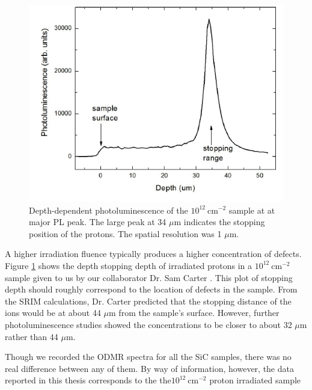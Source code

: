 \documentclass[oneside, noacknowlegments]{BYUPhys}
\begin{document}
\begin{figure}[h]
    \centerline{\includegraphics{srim_fig}}
    \caption[SiC Depth-Dependent Photoluminescence]{\label{fig:SiCDepth}
     Depth-dependent photoluminescence of the $10^{12}~\text{cm}^{−2}$ sample at at major PL peak. The large peak at 34 $\mu$m indicates the stopping position of the protons. The spatial resolution was 1 $\mu$m.}
 \end{figure}

A higher irradiation fluence typically produces a higher concentration of defects. Figure \ref{fig:SiCDepth} shows the depth stopping depth of irradiated protons in a $10^{12}~\text{cm}^{-2}$ sample given to us by our collaborator Dr. Sam Carter \cite{RefWorks:doc:5892964ee4b0499fa95c5108}. This plot of stopping depth should roughly correspond to the location of defects in the sample. From the SRIM calculations, Dr. Carter predicted that the stopping distance of the ions would be at about 44 $\mu$m from the sample's surface. However, further photoluminescence studies showed the concentrations to be closer to about 32 $\mu$m rather than 44 $\mu$m. 

Though we recorded the ODMR spectra for all the SiC samples, there was no real difference between any of them. By way of information, however, the data reported in this thesis corresponds to the the$10^{12}~\text{cm}^{-2}$ proton irradiated sample
\end{document}
